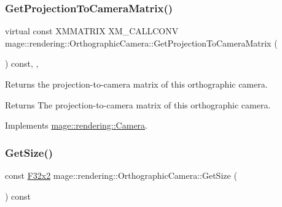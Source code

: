 \hypertarget{classmage_1_1rendering_1_1_orthographic_camera_a7d52862a3762dcaeadf26e8ae92d9d09}{}\label{classmage_1_1rendering_1_1_orthographic_camera_a7d52862a3762dcaeadf26e8ae92d9d09} 
\subsubsection{\texorpdfstring{Get\+Projection\+To\+Camera\+Matrix()}{GetProjectionToCameraMatrix()}}
{\footnotesize\ttfamily virtual const X\+M\+M\+A\+T\+R\+IX X\+M\+\_\+\+C\+A\+L\+L\+C\+O\+NV mage\+::rendering\+::\+Orthographic\+Camera\+::\+Get\+Projection\+To\+Camera\+Matrix (\begin{DoxyParamCaption}{ }\end{DoxyParamCaption}) const\hspace{0.3cm}{\ttfamily [override]}, {\ttfamily [virtual]}, {\ttfamily [noexcept]}}

Returns the projection-\/to-\/camera matrix of this orthographic camera.

\begin{DoxyReturn}{Returns}
The projection-\/to-\/camera matrix of this orthographic camera. 
\end{DoxyReturn}


Implements \hyperlink{classmage_1_1rendering_1_1_camera_abb21116f8a6c7513804431d23fa4cf17}{mage\+::rendering\+::\+Camera}.

\hypertarget{classmage_1_1rendering_1_1_orthographic_camera_abeb7a7d73f667ed7c9a38e5370bcb5e8}{}\label{classmage_1_1rendering_1_1_orthographic_camera_abeb7a7d73f667ed7c9a38e5370bcb5e8} 
\subsubsection{\texorpdfstring{Get\+Size()}{GetSize()}}
{\footnotesize\ttfamily const \hyperlink{namespacemage_aa87237ad091f5cd7da612b8523fc108f}{F32x2} mage\+::rendering\+::\+Orthographic\+Camera\+::\+Get\+Size (\begin{DoxyParamCaption}{ }\end{DoxyParamCaption}) const\hspace{0.3cm}{\ttfamily [noexcept]}}

